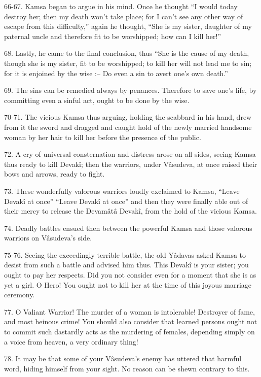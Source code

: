 66-67. Kamsa began to argue in his mind. Once he thought ``I would today destroy her; then my death won't take place; for I can't see any other way of escape from this difficulty,'' again he thought, ``She is my sister, daughter of my paternal uncle and therefore fit to be worshipped; how can I kill her!''

68. Lastly, he came to the final conclusion, thus ``She is the cause of my death, though she is my sister, fit to be worshipped; to kill her will not lead me to sin; for it is enjoined by the wise :-- Do even a sin to avert one's own death.''

69. The sins can be remedied always by penances. Therefore to save one's life, by committing even a sinful act, ought to be done by the wise.

70-71. The vicious Kamsa thus arguing, holding the scabbard in his hand, drew from it the sword and dragged and caught hold of the newly married handsome woman by her hair to kill her before the presence of the public.

72. A cry of universal consternation and distress arose on all sides, seeing Kamsa thus ready to kill Devak\^i; then the warriors, under V\^asudeva, at once raised their bows and arrows, ready to fight.

73. These wonderfully valorous warriors loudly exclaimed to Kamsa, ``Leave Devak\^i at once'' ``Leave Devak\^i at once'' and then they were finally able out of their mercy to release the Devam\^at\^a Devak\^i, from the hold of the vicious Kamsa.

74. Deadly battles ensued then between the powerful Kamsa and those valorous warriors on V\^asudeva's side.

75-76. Seeing the exceedingly terrible battle, the old Y\^adavas asked Kamsa to desist from such a battle and advised him thus. This Devak\^i is your sister; you ought to pay her respects. Did you not consider even for a moment that she is as yet a girl. O Hero! You ought not to kill her at the time of this joyous marriage ceremony.

77. O Valiant Warrior! The murder of a woman is intolerable! Destroyer of fame, and most heinous crime! You should also consider that learned persons ought not to commit such dastardly acts as the murdering of females, depending simply on a voice from heaven, a very ordinary thing!

78. It may be that some of your V\^asudeva's enemy has uttered that harmful word, hiding himself from your sight. No reason can be shewn contrary to this.

